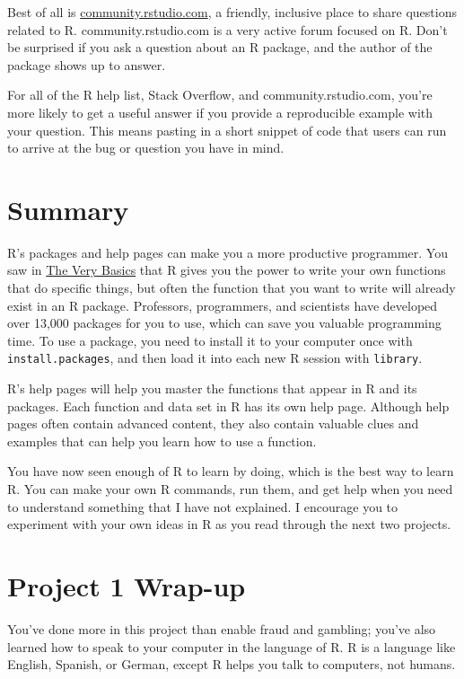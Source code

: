 \documentclass[
  letterpaper,
  DIV=11,
  numbers=noendperiod]{scrbook}
\begin{document}
Best of all is
\href{http://community.rstudio.com}{community.rstudio.com}, a friendly,
inclusive place to share questions related to R. community.rstudio.com
is a very active forum focused on R. Don't be surprised if you ask a
question about an R package, and the author of the package shows up to
answer.

For all of the R help list, Stack Overflow, and community.rstudio.com,
you're more likely to get a useful answer if you provide a reproducible
example with your question. This means pasting in a short snippet of
code that users can run to arrive at the bug or question you have in
mind.

\section{Summary}\label{summary-1}

R's packages and help pages can make you a more productive programmer.
You saw in \hyperref[sec-basics]{The Very Basics} that R gives you the
power to write your own functions that do specific things, but often the
function that you want to write will already exist in an R package.
Professors, programmers, and scientists have developed over 13,000
packages for you to use, which can save you valuable programming time.
To use a package, you need to install it to your computer once with
\texttt{install.packages}, and then load it into each new R session with
\texttt{library}.

R's help pages will help you master the functions that appear in R and
its packages. Each function and data set in R has its own help page.
Although help pages often contain advanced content, they also contain
valuable clues and examples that can help you learn how to use a
function.

You have now seen enough of R to learn by doing, which is the best way
to learn R. You can make your own R commands, run them, and get help
when you need to understand something that I have not explained. I
encourage you to experiment with your own ideas in R as you read through
the next two projects.

\section{Project 1 Wrap-up}\label{project-1-wrap-up}

You've done more in this project than enable fraud and gambling; you've
also learned how to speak to your computer in the language of R. R is a
language like English, Spanish, or German, except R helps you talk to
computers, not humans.
\end{document}
